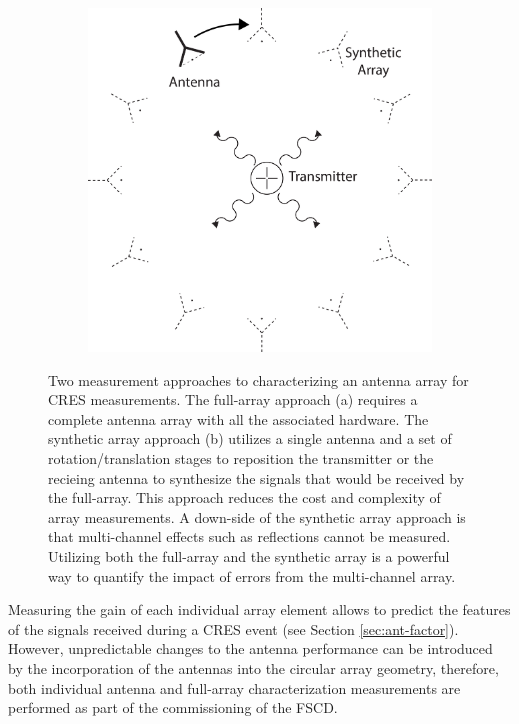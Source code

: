 \begin{figure}[htbp]
\begin{subfigure}[b]{0.4\textwidth}
        \includegraphics[width=1\textwidth]{figs/Chapter-5/230409_beamform_synth_array_meas.png}
        \caption{\label{fig:beam-synth-array-meas}}
    \end{subfigure}
    \hfill
    \caption{Two measurement approaches to characterizing an antenna array for CRES measurements. The full-array approach (a) requires a complete antenna array with all the associated hardware. The synthetic array approach (b) utilizes a single antenna and a set of rotation/translation stages to reposition the transmitter or the recieing antenna to synthesize the signals that would be received by the full-array. This approach reduces the cost and complexity of array measurements. A down-side of the synthetic array approach is that multi-channel effects such as reflections cannot be measured. Utilizing both the full-array and the synthetic array is a powerful way to quantify the impact of errors from the multi-channel array.}
    \qquad
    \label{fig:array-measurements}
\end{figure}

Measuring the gain of each individual array element allows to predict the features of the signals received during a CRES event (see Section \ref{sec:ant-factor}). However, unpredictable changes to the antenna performance can be introduced by the incorporation of the antennas into the circular array geometry, therefore, both individual antenna and full-array characterization measurements are performed as part of the commissioning of the FSCD.

